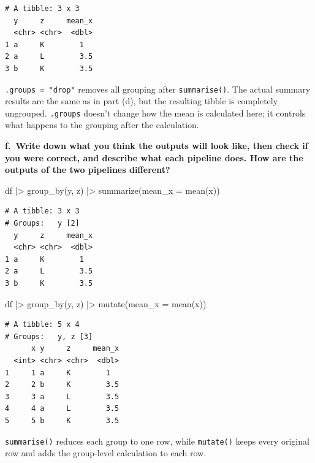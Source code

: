 \documentclass[
  letterpaper,
  DIV=11,
  numbers=noendperiod]{scrreprt}
\newenvironment{Shaded}{\begin{snugshade}}{\end{snugshade}}
\newcommand{\AttributeTok}[1]{\textcolor[rgb]{0.40,0.45,0.13}{#1}}
\newcommand{\FunctionTok}[1]{\textcolor[rgb]{0.28,0.35,0.67}{#1}}
\newcommand{\NormalTok}[1]{\textcolor[rgb]{0.00,0.23,0.31}{#1}}
\newcommand{\SpecialCharTok}[1]{\textcolor[rgb]{0.37,0.37,0.37}{#1}}
\begin{document}
\begin{verbatim}
# A tibble: 3 x 3
  y     z     mean_x
  <chr> <chr>  <dbl>
1 a     K        1  
2 a     L        3.5
3 b     K        3.5
\end{verbatim}

\texttt{.groups\ =\ "drop"} removes all grouping after
\texttt{summarise()}. The actual summary results are the same as in part
(d), but the resulting tibble is completely ungrouped. \texttt{.groups}
doesn't change how the mean is calculated here; it controls what happens
to the grouping after the calculation.

\textbf{f.~Write down what you think the outputs will look like, then
check if you were correct, and describe what each pipeline does. How are
the outputs of the two pipelines different?}

\begin{Shaded}
\begin{Highlighting}[]
\NormalTok{df }\SpecialCharTok{|\textgreater{}}
  \FunctionTok{group\_by}\NormalTok{(y, z) }\SpecialCharTok{|\textgreater{}}
  \FunctionTok{summarize}\NormalTok{(}\AttributeTok{mean\_x =} \FunctionTok{mean}\NormalTok{(x))}
\end{Highlighting}
\end{Shaded}

\begin{verbatim}
# A tibble: 3 x 3
# Groups:   y [2]
  y     z     mean_x
  <chr> <chr>  <dbl>
1 a     K        1  
2 a     L        3.5
3 b     K        3.5
\end{verbatim}

\begin{Shaded}
\begin{Highlighting}[]
\NormalTok{df }\SpecialCharTok{|\textgreater{}}
  \FunctionTok{group\_by}\NormalTok{(y, z) }\SpecialCharTok{|\textgreater{}}
  \FunctionTok{mutate}\NormalTok{(}\AttributeTok{mean\_x =} \FunctionTok{mean}\NormalTok{(x))}
\end{Highlighting}
\end{Shaded}

\begin{verbatim}
# A tibble: 5 x 4
# Groups:   y, z [3]
      x y     z     mean_x
  <int> <chr> <chr>  <dbl>
1     1 a     K        1  
2     2 b     K        3.5
3     3 a     L        3.5
4     4 a     L        3.5
5     5 b     K        3.5
\end{verbatim}

\texttt{summarise()} reduces each group to one row, while
\texttt{mutate()} keeps every original row and adds the group-level
calculation to each row.
\end{document}
